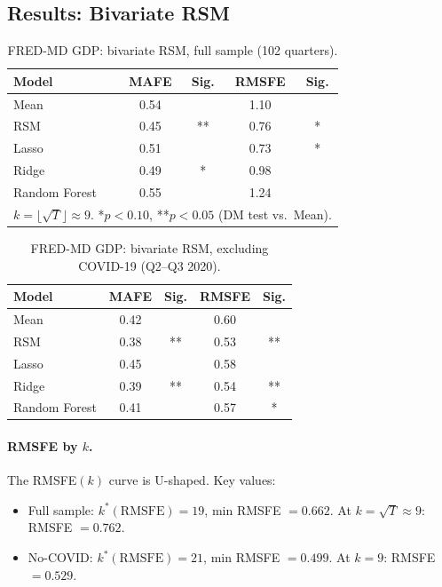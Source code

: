 \documentclass[12pt,a4paper]{article}
\begin{document}
\subsection{Results: Bivariate RSM}

\begin{table}[h]
\centering
\caption{FRED-MD GDP: bivariate RSM, full sample (102 quarters).}
\label{tab:gdp_biv_full}
\begin{tabular}{lcccc}
\toprule
Model & MAFE & Sig. & RMSFE & Sig. \\
\midrule
Mean           & 0.54 &     & 1.10 &    \\
RSM            & 0.45 & **  & 0.76 & *  \\
Lasso          & 0.51 &     & 0.73 & *  \\
Ridge          & 0.49 & *   & 0.98 &    \\
Random Forest  & 0.55 &     & 1.24 &    \\
\bottomrule
\multicolumn{5}{l}{\footnotesize $k = \lfloor\sqrt{T}\rfloor \approx 9$.
  *$p<0.10$, **$p<0.05$ (DM test vs.\ Mean).}
\end{tabular}
\end{table}

\begin{table}[h]
\centering
\caption{FRED-MD GDP: bivariate RSM, excluding COVID-19 (Q2--Q3 2020).}
\label{tab:gdp_biv_nocov}
\begin{tabular}{lcccc}
\toprule
Model & MAFE & Sig. & RMSFE & Sig. \\
\midrule
Mean           & 0.42 &     & 0.60 &     \\
RSM            & 0.38 & **  & 0.53 & **  \\
Lasso          & 0.45 &     & 0.58 &     \\
Ridge          & 0.39 & **  & 0.54 & **  \\
Random Forest  & 0.41 &     & 0.57 & *   \\
\bottomrule
\end{tabular}
\end{table}

\paragraph{RMSFE by $k$.}
The RMSFE$(k)$ curve is U-shaped. Key values:
\begin{itemize}
\item Full sample: $k^*(\text{RMSFE}) = 19$, min RMSFE $= 0.662$.
      At $k=\sqrt{T} \approx 9$: RMSFE $= 0.762$.
\item No-COVID: $k^*(\text{RMSFE}) = 21$, min RMSFE $= 0.499$.
      At $k = 9$: RMSFE $= 0.529$.
\end{itemize}
\end{document}
